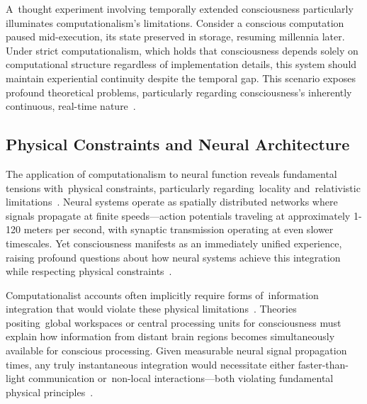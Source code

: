 A~thought experiment involving temporally extended consciousness particularly illuminates computationalism's limitations. Consider a conscious computation paused mid-execution, its state preserved in storage, resuming millennia later. Under strict computationalism, which holds that consciousness depends solely on computational structure regardless of implementation details, this system should maintain experiential continuity despite the temporal gap. This scenario exposes profound theoretical problems, particularly regarding consciousness's inherently continuous, real-time nature~\cite{dehaene2011experimental,mashour2020conscious}.

\subsection*{Physical Constraints and Neural Architecture}

The application of computationalism to neural function reveals fundamental tensions with~physical constraints, particularly regarding~locality and~relativistic limitations~\cite{breakspear2005dynamics,Gidon2020}. Neural systems operate as spatially distributed networks where signals propagate at finite speeds—action potentials traveling at approximately 1-120 meters per second, with synaptic transmission operating at even slower timescales. Yet consciousness manifests as an immediately unified experience, raising profound questions about how neural systems achieve this integration while respecting physical constraints~\cite{hunt2024electromagnetic,McFadden2020}.

Computationalist accounts often implicitly require forms of~information integration that would violate these physical limitations~\cite{bayne2010unity,mashour2020conscious}. Theories positing~global workspaces or central processing units for consciousness must explain how information from distant brain regions becomes simultaneously available for conscious processing. Given measurable neural signal propagation times, any truly instantaneous integration would necessitate either faster-than-light communication or~non-local interactions—both violating fundamental physical principles~\cite{pinotsis2023vivo,amil2024theta}.

